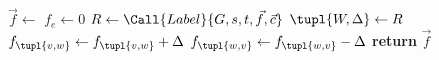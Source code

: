 \begin{algorithmic}
\State $\vec{f}\gets$
\State $f_e\gets 0$
\EndFor
\Repeat
\State $R\gets\Call{Label}{G,s,t,\vec{f},\vec{c}}$
\State $\tupl{W,\Delta}\gets R$
\State $f_{\tupl{v,w}}\gets f_{\tupl{v,w}}+\Delta$
\Else
\State $f_{\tupl{w,v}}\gets f_{\tupl{w,v}}-\Delta$
\EndIf
\EndFor
\EndIf
{}
\State \textbf{return} $\vec{f}$
\EndFunction
\end{algorithmic}
